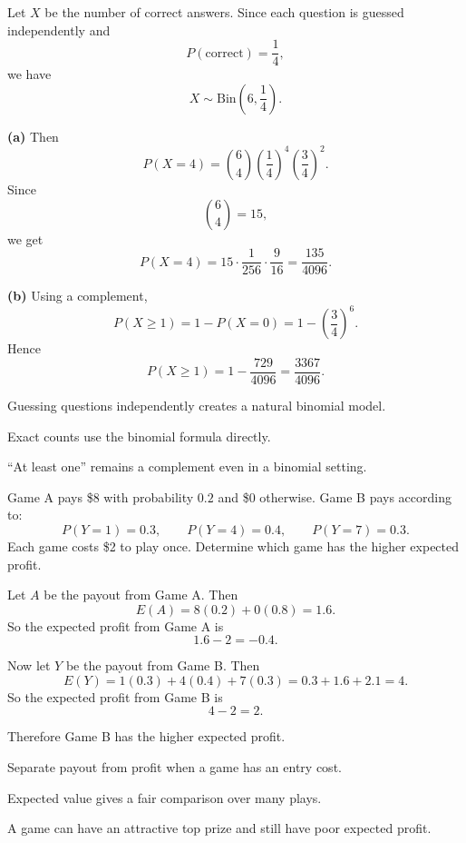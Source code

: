 \begin{solution}
Let $X$ be the number of correct answers. Since each question is guessed independently and
\[
P(\text{correct})=\frac14,
\]
we have
\[
X\sim \mathrm{Bin}\left(6,\frac14\right).
\]

\textbf{(a)} Then
\[
P(X=4)=\binom64\left(\frac14\right)^4\left(\frac34\right)^2.
\]
Since
\[
\binom64=15,
\]
we get
\[
P(X=4)=15\cdot \frac1{256}\cdot \frac9{16}
=\frac{135}{4096}.
\]

\textbf{(b)} Using a complement,
\[
P(X\ge 1)=1-P(X=0)=1-\left(\frac34\right)^6.
\]
Hence
\[
P(X\ge 1)=1-\frac{729}{4096}=\frac{3367}{4096}.
\]
\end{solution}

\begin{takeaways}
\item Guessing questions independently creates a natural binomial model.
\item Exact counts use the binomial formula directly.
\item ``At least one'' remains a complement even in a binomial setting.
\end{takeaways}

\begin{problem}
Game A pays \$8 with probability $0.2$ and \$0 otherwise. Game B pays according to:
\[
P(Y=1)=0.3,\qquad P(Y=4)=0.4,\qquad P(Y=7)=0.3.
\]
Each game costs \$2 to play once. Determine which game has the higher expected profit.
\end{problem}

\begin{solution}
Let $A$ be the payout from Game A. Then
\[
E(A)=8(0.2)+0(0.8)=1.6.
\]
So the expected profit from Game A is
\[
1.6-2=-0.4.
\]

Now let $Y$ be the payout from Game B. Then
\[
E(Y)=1(0.3)+4(0.4)+7(0.3)=0.3+1.6+2.1=4.
\]
So the expected profit from Game B is
\[
4-2=2.
\]

Therefore Game B has the higher expected profit.
\end{solution}

\begin{takeaways}
\item Separate payout from profit when a game has an entry cost.
\item Expected value gives a fair comparison over many plays.
\item A game can have an attractive top prize and still have poor expected profit.
\end{takeaways}

